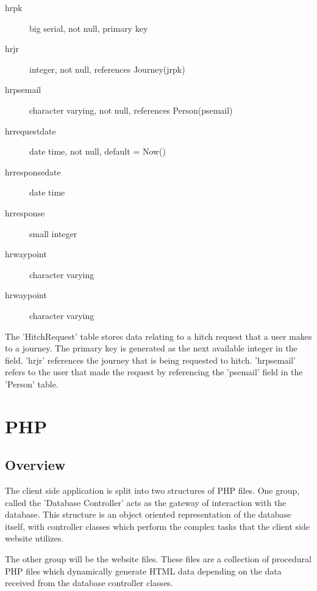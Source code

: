 \documentclass[11pt]{article}
\begin{document}
\begin{description}
	\begin{description}
	\item[hr\textunderscore pk] big serial, not null, primary key
	\item[hr\textunderscore jr] integer, not null, references Journey(jr\textunderscore pk)
	\item[hr\textunderscore ps\textunderscore email] character varying, not null, references Person(ps\textunderscore email)
	\item[hr\textunderscore request\textunderscore date] date time, not null, default = Now()
	\item[hr\textunderscore response\textunderscore date] date time
	\item[hr\textunderscore response] small integer
	\item[hr\textunderscore waypoint] character varying
	\item[hr\textunderscore waypoint] character varying
	\end{description}
	
The 'Hitch\textunderscore Request' table stores data relating to a hitch request that a user makes to a journey. The primary key is generated as the next available integer in the field. 'hr\textunderscore jr' references the journey that is being requested to hitch. 'hr\textunderscore ps\textunderscore email' refers to the user that made the request by referencing the 'ps\textunderscore email' field in the 'Person' table.
	
\end{description}


\section{PHP}
\subsection{Overview}
The client side application is split into two structures of PHP files. One group, called the 'Database Controller' acts as the gateway of interaction with the database. This structure is an object oriented representation of the database itself, with controller classes which perform the complex tasks that the client side website utilizes.

The other group will be the website files. These files are a collection of procedural PHP files which dynamically generate HTML data depending on the data received from the database controller classes.
\end{document}
